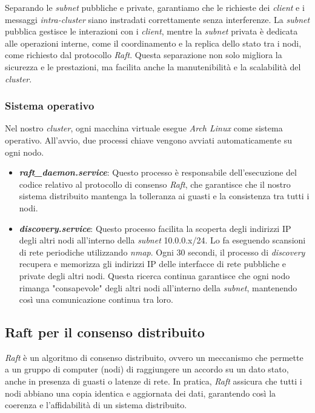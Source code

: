 Separando le \textit{subnet} pubbliche e private, garantiamo che le richieste dei \textit{client} e i messaggi \textit{intra-cluster} siano instradati correttamente senza interferenze. La \textit{subnet} pubblica gestisce 
le interazioni con i \textit{client}, mentre la \textit{subnet} privata è dedicata alle operazioni interne, come il coordinamento e la replica dello stato tra i nodi, come richiesto dal protocollo \textit{Raft}. Questa separazione 
non solo migliora la sicurezza e le prestazioni, ma facilita anche la manutenibilità e la scalabilità del \textit{cluster}.

\subsubsection{Sistema operativo}
Nel nostro \textit{cluster}, ogni macchina virtuale esegue \textit{Arch Linux} come sistema operativo. All'avvio, due processi chiave vengono avviati automaticamente su ogni nodo.
\begin{itemize}
  \item \textit{\textbf{raft\_daemon.service}}: Questo processo è responsabile dell'esecuzione del codice relativo al protocollo di consenso \textit{Raft}, che garantisce che il nostro sistema distribuito mantenga la tolleranza 
    ai guasti e la consistenza tra tutti i nodi.
  \item \textit{\textbf{discovery.service}}: Questo processo facilita la scoperta degli indirizzi IP degli altri nodi all'interno della \textit{subnet} 10.0.0.x/24. Lo fa eseguendo scansioni di rete periodiche utilizzando 
    \textit{nmap}. Ogni 30 secondi, il processo di \textit{discovery} recupera e memorizza gli indirizzi IP delle interfacce di rete pubbliche e private degli altri nodi. Questa ricerca continua garantisce che ogni nodo 
    rimanga "consapevole" degli altri nodi all'interno della \textit{subnet}, mantenendo così una comunicazione continua tra loro.
\end{itemize}



\subsection{Raft per il consenso distribuito}
\textit{Raft} è un algoritmo di consenso distribuito, ovvero un meccanismo che permette a un gruppo di computer (nodi) di raggiungere un accordo su un dato stato, anche in presenza di guasti o latenze di rete. In pratica, 
\textit{Raft} assicura che tutti i nodi abbiano una copia identica e aggiornata dei dati, garantendo così la coerenza e l'affidabilità di un sistema distribuito.

